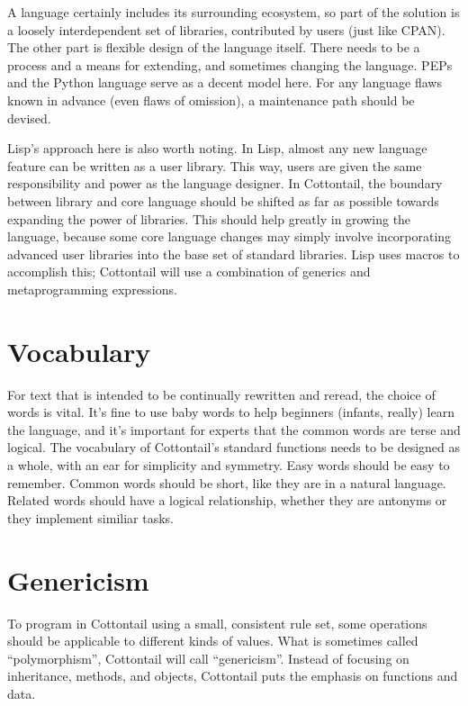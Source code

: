 A language certainly includes its surrounding ecosystem, so part of
the solution is a loosely interdependent set of libraries, contributed
by users (just like CPAN). The other part is flexible design of the
language itself. There needs to be a process and a means for
extending, and sometimes changing the language. PEPs and the Python
language serve as a decent model here. For any language flaws known in
advance (even flaws of omission), a maintenance path should be
devised.

Lisp's approach here is also worth noting. In Lisp, almost any new
language feature can be written as a user library. This way, users are
given the same responsibility and power as the language designer. In
Cottontail, the boundary between library and core language should be
shifted as far as possible towards expanding the power of libraries.
This should help greatly in growing the language, because some core
language changes may simply involve incorporating advanced user
libraries into the base set of standard libraries. Lisp uses macros to
accomplish this; Cottontail will use a combination of generics and
metaprogramming expressions.


\section{Vocabulary}

For text that is intended to be continually rewritten and reread, the
choice of words is vital. It's fine to use baby words to help
beginners (infants, really) learn the language, and it's important for
experts that the common words are terse and logical. The vocabulary of
Cottontail's standard functions needs to be designed as a whole, with
an ear for simplicity and symmetry. Easy words should be easy to
remember. Common words should be short, like they are in a natural
language. Related words should have a logical relationship, whether
they are antonyms or they implement similiar tasks.


\section{Genericism}

To program in Cottontail using a small, consistent rule set, some
operations should be applicable to different kinds of values.
What is sometimes called ``polymorphism'', Cottontail will call
``genericism''. Instead of focusing on inheritance, methods, and
objects, Cottontail puts the emphasis on functions and data.

